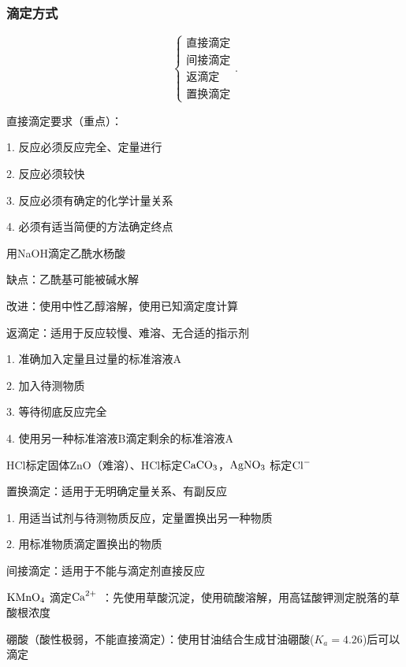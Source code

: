 \subsubsection{滴定方式}%
\label{subsub:滴定方式}
\[
    \begin{cases}
        \text{直接滴定}\\
        \text{间接滴定}\\
        \text{返滴定}\\
        \text{置换滴定}
    \end{cases}
.\] 
\begin{notation}
    直接滴定要求（重点）：

    1. 反应必须反应完全、定量进行

    2. 反应必须较快

    3. 反应必须有确定的化学计量关系

    4. 必须有适当简便的方法确定终点
\end{notation}
\begin{eg}
    用NaOH滴定乙酰水杨酸

    缺点：乙酰基可能被碱水解

    改进：使用中性乙醇溶解，使用已知滴定度计算
\end{eg}
\begin{notation}
    返滴定：适用于反应较慢、难溶、无合适的指示剂

    1. 准确加入定量且过量的标准溶液A

    2. 加入待测物质

    3. 等待彻底反应完全

    4. 使用另一种标准溶液B滴定剩余的标准溶液A
\end{notation}
\begin{eg}
    HCl标定固体ZnO（难溶）、HCl标定$\ce{CaCO_3}$，$\ce{AgNO_3}$ 标定$\ce{Cl-}$
\end{eg}
\begin{notation}
    置换滴定：适用于无明确定量关系、有副反应

    1. 用适当试剂与待测物质反应，定量置换出另一种物质

    2. 用标准物质滴定置换出的物质
\end{notation}
\begin{notation}
    间接滴定：适用于不能与滴定剂直接反应
\end{notation}
\begin{eg}
    $\ce{KMnO_4}$ 滴定$\ce{Ca^2+}$ ：先使用草酸沉淀，使用硫酸溶解，用高锰酸钾测定脱落的草酸根浓度
\end{eg}
\begin{eg}
    硼酸（酸性极弱，不能直接滴定）：使用甘油结合生成甘油硼酸($K_a=4.26$)后可以滴定
\end{eg}






